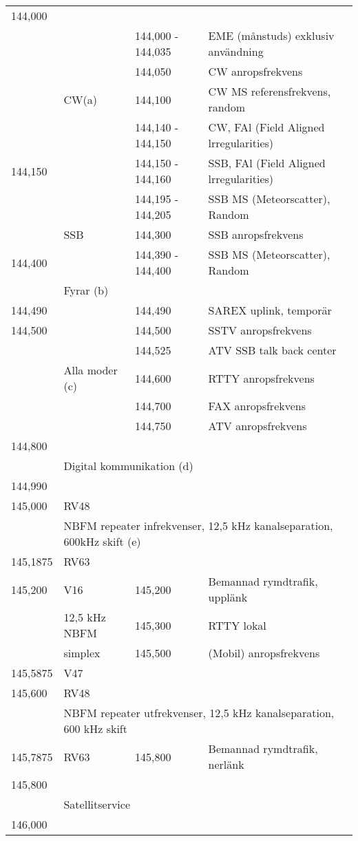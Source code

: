 \begin{longtable}{llll}
144,000 & & & \\
        &       & 144,000 - 144,035 & EME (månstuds) exklusiv användning \\
        &       & 144,050           & CW anropsfrekvens \\
        & CW(a) & 144,100           & CW MS referensfrekvens, random \\
        &       & 144,140 - 144,150 & CW, FAl (Field Aligned lrregularities) \\
144,150 &       & 144,150 - 144,160 & SSB, FAl (Field Aligned lrregularities) \\
        &       & 144,195 - 144,205 & SSB MS (Meteorscatter), Random \\
        & SSB   & 144,300           & SSB anropsfrekvens \\
144,400 &       & 144,390 - 144,400 & SSB MS (Meteorscatter), Random \\
        & Fyrar (b) & & \\
144,490 &       & 144,490 & SAREX uplink, temporär \\
144,500 &       & 144,500 & SSTV anropsfrekvens \\
        &       & 144,525 & ATV SSB talk back center \\
        & Alla moder (c) & 144,600 & RTTY anropsfrekvens \\
        &       & 144,700 & FAX anropsfrekvens \\
        &       & 144,750 & ATV anropsfrekvens \\
144,800 & & & \\
        & \multicolumn{3}{l}{Digital kommunikation (d)} \\
144,990 & & & \\
145,000 & RV48 & & \\
        & \multicolumn{3}{l}{NBFM repeater infrekvenser, 12,5 kHz kanalseparation, 600kHz skift (e)} \\
145,1875 & RV63 & & \\
145,200 & V16   & 145,200 & Bemannad rymdtrafik, upplänk \\
        & 12,5 kHz NBFM & 145,300 & RTTY lokal \\
        & simplex & 145,500 & (Mobil) anropsfrekvens \\
145,5875 & V47 & & \\
145,600 & RV48 & & \\
        & \multicolumn{3}{l}{NBFM repeater utfrekvenser, 12,5 kHz kanalseparation, 600 kHz skift} \\
145,7875 & RV63 & 145,800 & Bemannad rymdtrafik, nerlänk \\
145,800 & & & \\
        & \multicolumn{3}{l}{Satellitservice} \\
146,000 & & & \\
\end{longtable}

